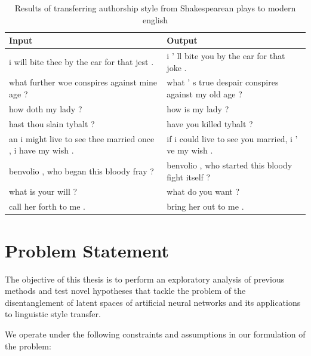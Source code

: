 \begin{table}[ht]
	\centering
	\begin{tabular}{ | p{.45\linewidth} | p{.45\linewidth} | }
		\hline
		\textbf{Input}                                              & \textbf{Output}                                      \\
		\hline \hline
		i will bite thee by the ear for that jest .                 & i ’ ll bite you by the ear for that joke .           \\
		\hline
		what further woe conspires against mine age ?               & what ’ s true despair conspires against my old age ? \\
		\hline
		how doth my lady ?                                          & how is my lady ?                                     \\
		\hline
		hast thou slain tybalt ?                                    & have you killed tybalt ?                             \\
		\hline
		an i might live to see thee married once , i have my wish . & if i could live to see you married, i ’ ve my wish . \\
		\hline
		benvolio , who began this bloody fray ?                     & benvolio , who started this bloody fight itself ?    \\
		\hline
		what is your will ?                                         & what do you want ?                                   \\
		\hline
		call her forth to me .                                      & bring her out to me .                                \\
		\hline
	\end{tabular}
	\label{table:paraphrasing-for-style-results}
	\caption{Results of transferring authorship style from Shakespearean plays to modern english}
\end{table}


\section{Problem Statement}

The objective of this thesis is to perform an exploratory analysis of previous methods and test novel hypotheses that tackle the problem of the disentanglement of latent spaces of artificial neural networks and its applications to linguistic style transfer.

We operate under the following constraints and assumptions in our formulation of the problem:

